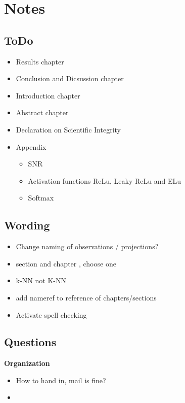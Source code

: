 \chapter{Notes}

\section{ToDo}
\begin{itemize}
    \item Results chapter
    \item Conclusion and Dicsussion chapter
    \item Introduction chapter
    \item Abstract chapter
    \item Declaration on Scientific Integrity
    \item Appendix
    \begin{itemize}
        \item SNR
        \item Activation functions ReLu,  Leaky ReLu and ELu
        \item Softmax
    \end{itemize}
\end{itemize}

\section{Wording}
\begin{itemize}
    \item Change naming of observations / projections?
    \item section and chapter , choose one
    \item k-NN not K-NN
    \item add nameref to reference of chapters/sections
    \item Activate spell checking
\end{itemize}

\section{Questions}
\textbf{Organization}
\begin{itemize}
    \item How to hand in, mail is fine?
    \item 
\end{itemize}

\clearpage

